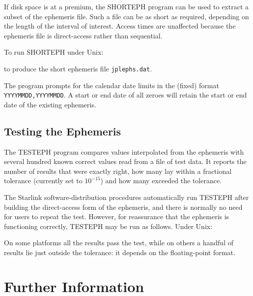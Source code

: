 \documentclass[twoside,11pt,nolof]{starlink}
\begin{document}
If disk space is at a premium, the SHORTEPH program can be used to
extract a subset of the ephemeris file.  Such a file can be as short
as required, depending on the length of the interval of interest.
Access times are unaffected because the ephemeris file is direct-access
rather than sequential.

To run SHORTEPH under Unix:

\begin{terminalv}
\end{terminalv}

to produce the short ephemeris file \texttt{jplephs.dat}.

The program prompts for the calendar date limits in the (fixed) format
\texttt{YYYYMMDD,YYYYMMDD}.  A start or end date of all zeroes will
retain the start or end date of the existing ephemeris.

\subsection{Testing the Ephemeris}
\label{testing_the_ephemeris}

The TESTEPH program compares values interpolated from the ephemeris
with several hundred known correct values read from a file of test data.
It reports the number of results that were exactly right, how many lay
within a fractional tolerance (currently set to $10^{-15}$) and how many
exceeded the tolerance.

The Starlink software-distribution procedures automatically run
TESTEPH after building the direct-access form of the ephemeris, and
there is normally no need for users to repeat the test.  However, for
reassurance that the ephemeris is functioning correctly, TESTEPH may be
run as follows.  Under Unix:

\begin{terminalv}
\end{terminalv}

On some platforms all the results pass the test, while on others a
handful of results lie just outside the tolerance:  it depends on the
floating-point format.

\section{Further Information}
\label{further_information}
\end{document}
